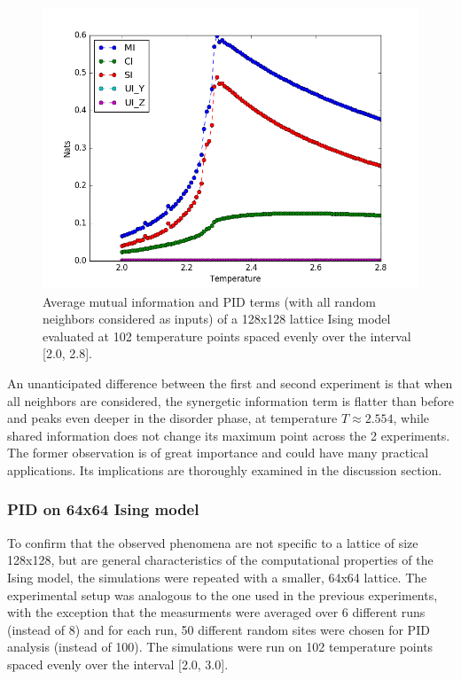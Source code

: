 \documentclass[12pt]{article}
\begin{document}
\begin{figure} [h!]
\begin{center}
\includegraphics[width=\textwidth]{ising-128-pid-4-nbs}
\caption{Average mutual information and PID terms (with all random neighbors considered as inputs) of a 128x128 lattice Ising model evaluated at 102 temperature points spaced evenly over the interval [2.0, 2.8].}
\label{fig:ising-128-pid-4-nbs}
\end{center}
\end{figure}

An unanticipated difference between the first and second experiment is that when all neighbors are considered, the synergetic information term is flatter than before and peaks even deeper in the disorder phase, at temperature $T \approx 2.554$, while shared information does not change its maximum point across the 2 experiments. The former observation is of great importance and could have many practical applications. Its implications are thoroughly examined in the discussion section. 

\subsubsection{PID on 64x64 Ising model}

To confirm that the observed phenomena are not specific to a lattice of size 128x128, but are general characteristics of the computational properties of the Ising model, the simulations were repeated with a smaller, 64x64 lattice. The experimental setup was analogous to the one used in the previous experiments, with the exception that the measurments were averaged over 6 different runs (instead of 8) and for each run, 50 different random sites were chosen for PID analysis (instead of 100). The simulations were run on 102 temperature points spaced evenly over the interval [2.0, 3.0].
\end{document}

